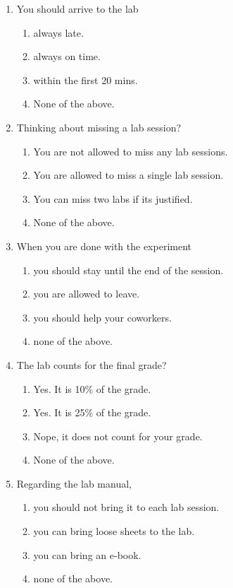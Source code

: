 \documentclass[cover.tex]{subfiles}
\begin{document}
 \begin{refsection}

\begin{multicols*}{2}
\begin{enumerate}

\item You should arrive to the lab
\begin{enumerate}[label=(\alph*)]
\item always late.
\item always on time.
\item within the first 20 mins.
\item None of the above.
\end{enumerate}

\item Thinking about missing a lab session?
\begin{enumerate}[label=(\alph*)]
\item You are not allowed to miss any lab sessions.
\item You are allowed to miss a single lab session.
\item You can miss two labs if its justified.
\item None of the above.
\end{enumerate}

\item When you are done with the experiment
\begin{enumerate}[label=(\alph*)]
\item you should stay until the end of the session.
\item you are allowed to leave.
\item you should help your coworkers.
\item none of the above.
\end{enumerate}

\item The lab counts for the final grade?
\begin{enumerate}[label=(\alph*)]
\item Yes. It is 10\% of the grade.
\item Yes. It is 25\% of the grade.
\item Nope, it does not count for your grade.
\item None of the above.
\end{enumerate}

\item Regarding the lab manual,
\begin{enumerate}[label=(\alph*)]
\item you should not bring it to each lab session.
\item you can bring loose sheets to the lab.
\item you can bring an e-book.
\item none of the above.
\end{enumerate}


\end{enumerate}
\end{multicols*}
\end{refsection}
\end{document}

